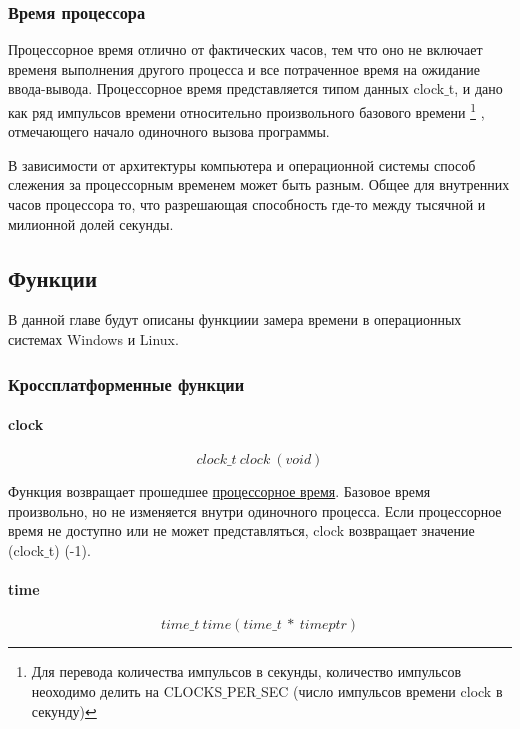 \documentclass{article}
\begin{document}
			\subsubsection{Время процессора}
				Процессорное время отлично от фактических часов, тем что оно не включает временя выполнения другого процесса и 					все потраченное время на ожидание ввода-вывода. Процессорное время представляется типом данных clock$\_$t, и дано 					как ряд импульсов времени относительно произвольного базового времени
			\footnote{Для перевода количества импульсов в секунды, количество импульсов неоходимо делить на CLOCKS$\_$PER$\_$SEC 				(число	импульсов времени clock в секунду)}
			, отмечающего начало одиночного вызова программы. 
				
				В зависимости от архитектуры компьютера и операционной системы способ слежения за процессорным временем может 					быть разным. Общее для внутренних часов процессора то, что разрешающая способность где-то между тысячной и милионной 				долей секунды.
		
		\subsection{Функции}
		В данной главе будут описаны функциии замера времени в операционных системах Windows и Linux. 
		\subsubsection{Кроссплатформенные функции}
			\paragraph{clock}
				$$clock\_t~clock~(void)$$
				
				Функция возвращает прошедшее \underline{процессорное время}. Базовое время произвольно, но не изменяется внутри 				одиночного процесса. Если процессорное время не доступно или не может представляться, clock возвращает значение 					(clock$\_$t) (-1).
			\paragraph*{time}
				$$time\_t~time(time\_t~ *~ timeptr)$$
				
\end{document}
